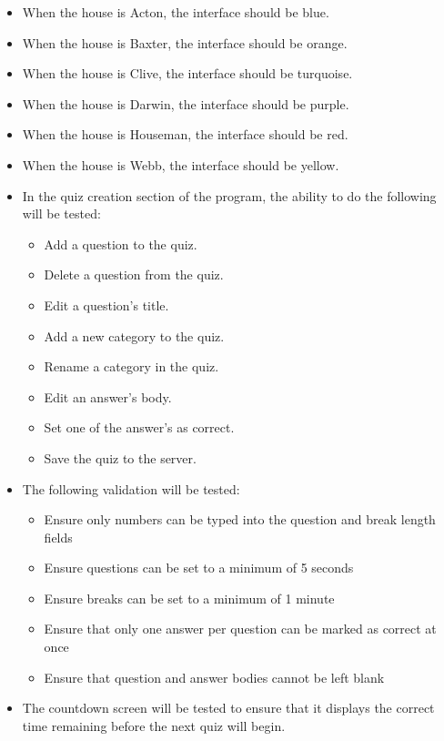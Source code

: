 \begin{itemize}
  \item When the house is Acton, the interface should be blue.
  \item When the house is Baxter, the interface should be orange.
  \item When the house is Clive, the interface should be turquoise.
  \item When the house is Darwin, the interface should be purple.
  \item When the house is Houseman, the interface should be red.
  \item When the house is Webb, the interface should be yellow.

  \item In the quiz creation section of the program, the ability to do the following will be tested:
  \begin{itemize}
    \item Add a question to the quiz.
    \item Delete a question from the quiz.
    \item Edit a question's title.
    \item Add a new category to the quiz.
    \item Rename a category in the quiz.
    \item Edit an answer's body.
    \item Set one of the answer's as correct.
    \item Save the quiz to the server.
  \end{itemize}

  \item The following validation will be tested:
  \begin{itemize}
    \item Ensure only numbers can be typed into the question and break length fields
    \item Ensure questions can be set to a minimum of 5 seconds
    \item Ensure breaks can be set to a minimum of 1 minute
    \item Ensure that only one answer per question can be marked as correct at once
    \item Ensure that question and answer bodies cannot be left blank
  \end{itemize}

  \item The countdown screen will be tested to ensure that it displays the correct time remaining before the next quiz will begin.


\end{itemize}

